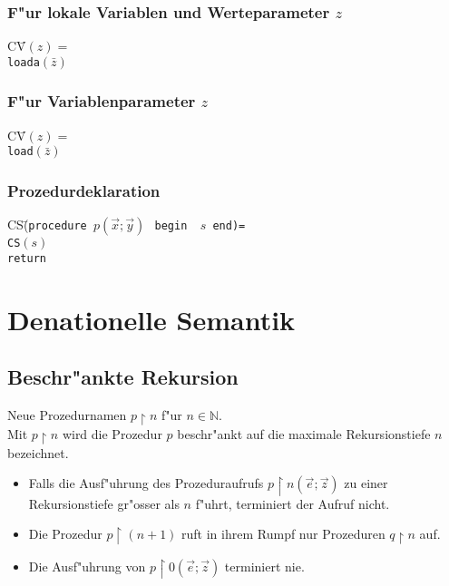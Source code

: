 \documentclass[german,10pt, a4paper, twocolumn]{scrartcl}
\theoremstyle{definition}
\theoremstyle{remark}
\begin{document}
\subsubsection{F"ur lokale Variablen und Werteparameter $z$}

\begin{tabbing}
 CV\=$(z)=$ \\
 \>	\tt{loada}$(\bar{z})$
\end{tabbing}

\subsubsection{F"ur Variablenparameter $z$}

\begin{tabbing}
 CV\=$(z)=$ \\
 \>	\tt{load}$(\bar{z})$
\end{tabbing}


\subsubsection{Prozedurdeklaration}

\begin{tabbing}
 CS\=(\tt{procedure }$p(\vec{x};\vec{y})\ $ \tt{begin } $s$ \tt{end})= \\
 \>	CS$(s)$\\
 \>	\tt{return}
\end{tabbing}

\section{Denationelle Semantik}

\subsection{Beschr"ankte Rekursion}

Neue Prozedurnamen $p\upharpoonright n$ f"ur $n\in \mathbb{N}$.\\

Mit $p\upharpoonright n$ wird die Prozedur $p$ beschr"ankt auf die maximale Rekursionstiefe $n$ bezeichnet.

\begin{itemize}
	\item Falls die Ausf"uhrung des Prozeduraufrufs $p\upharpoonright n(\vec{e};\vec{z})$ zu einer Rekursionstiefe gr"osser als $n$ f"uhrt, terminiert der Aufruf nicht.
	\item Die Prozedur $p\upharpoonright (n+1)$ ruft in ihrem Rumpf nur Prozeduren $q\upharpoonright n$ auf.
	\item Die Ausf"uhrung von $p\upharpoonright 0 (\vec{e};\vec{z})$ terminiert nie.
\end{itemize}
\end{document}
